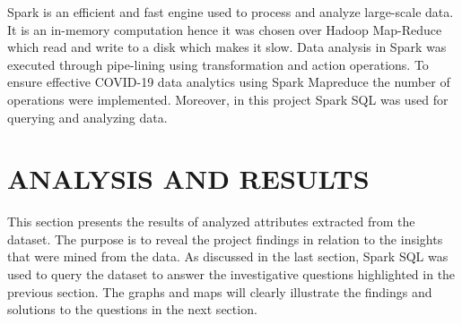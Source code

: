 \documentclass[12pt]{article}
\begin{document}
Spark is an efficient and fast engine used to process and analyze large-scale data. It is an in-memory computation hence it was chosen over Hadoop Map-Reduce which read  and write to a disk which makes it slow. Data analysis in Spark was  executed through pipe-lining using transformation and action operations. To ensure effective COVID-19 data analytics using Spark Mapreduce the number of operations were implemented. Moreover, in this project Spark SQL was used for querying  and analyzing data. 

\section{ANALYSIS AND RESULTS}

This section presents the results of analyzed attributes extracted from the dataset. The purpose is to reveal the project findings  in relation to the insights that were mined from the data. As discussed in the last section, Spark SQL was used to query the dataset to answer the  investigative questions highlighted in the previous section. The graphs and maps will clearly illustrate the findings and solutions to the  questions in the next section.  
\end{document}
